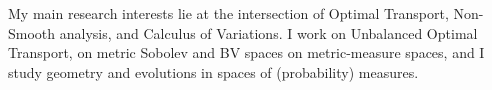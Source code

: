 My main research interests lie at the intersection of Optimal Transport, Non-Smooth analysis, and Calculus of Variations.  I work on Unbalanced Optimal Transport, on metric Sobolev and BV spaces on metric-measure spaces, and I study geometry and evolutions in spaces of (probability) measures.